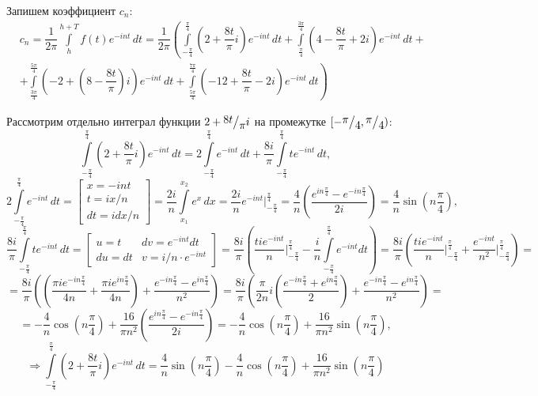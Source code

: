 \documentclass[a4paper, 16pt]{article}
\newcommand{\frc}[2]{\raisebox{2pt}{$#1$}\big/\raisebox{-3pt}{$#2$}}
\begin{document}
\noindent Запишем коэффициент $c_n$:
\begin{align*}
    & c_n=\dfrac{1}{2\pi}\int\limits_{h}^{h+T}f(t)e^{-int}\,dt=\dfrac{1}{2\pi}\left(\int\limits_{-\frac{\pi}{4}}^{\frac{\pi}{4}}\left(2+\dfrac{8t}{\pi}i\right)e^{-int}\,dt+\int\limits_{\frac{\pi}{4}}^{\frac{3\pi}{4}}\left(4-\dfrac{8t}{\pi}+2i\right)e^{-int}\,dt+\right.\\
    &\left. +\int\limits_{\frac{3\pi}{4}}^{\frac{5\pi}{4}}\left(-2+\left(8-\dfrac{8t}{\pi}\right)i\right)e^{-int}\,dt+\int\limits_{\frac{5\pi}{4}}^{\frac{7\pi}{4}}\left(-12+\dfrac{8t}{\pi}-2i\right)e^{-int}\,dt\right)
\end{align*}


\noindent Рассмотрим отдельно интеграл функции $2+\frc{8t}{\pi}i$ на промежутке $[-\frc{\pi}{4}, \frc{\pi}{4})$:
$$
\int\limits_{-\frac{\pi}{4}}^{\frac{\pi}{4}}\left(2+\dfrac{8t}{\pi}i\right)e^{-int}\,dt=
2\int\limits_{-\frac{\pi}{4}}^{\frac{\pi}{4}}e^{-int}\,dt+\dfrac{8i}{\pi}\int\limits_{-\frac{\pi}{4}}^{\frac{\pi}{4}}te^{-int}\,dt,
$$
$$
2\int\limits_{-\frac{\pi}{4}}^{\frac{\pi}{4}}e^{-int}\,dt=\begin{bmatrix}
    x=-int\\
    t=ix/n\\
    dt=idx/n
\end{bmatrix}=
\dfrac{2i}{n}\int\limits_{x_1}^{x_2}e^x\,dx=\dfrac{2i}{n}e^{-int}\bigg|_{-\frac{\pi}{4}}^{\frac{\pi}{4}}=
\dfrac{4}{n}\left(\dfrac{e^{in\frac{\pi}{4}}-e^{-in\frac{\pi}{4}}}{2i}\right)=\dfrac{4}{n}\sin{\left(n\dfrac{\pi}{4}\right)},
$$
$$
\dfrac{8i}{\pi}\int\limits_{-\frac{\pi}{4}}^{\frac{\pi}{4}}te^{-int}\,dt=
\begin{bmatrix}
    u=t & dv=e^{-int}dt\\
    du=dt & v=i/n\cdot e^{-int}
\end{bmatrix}=
\dfrac{8i}{\pi}\left(\dfrac{tie^{-int}}{n}\bigg|_{-\frac{\pi}{4}}^{\frac{\pi}{4}}-\dfrac{i}{n}\int\limits_{-\frac{\pi}{4}}^{\frac{\pi}{4}}e^{-int}dt\right)=
\dfrac{8i}{\pi}\left(\dfrac{tie^{-int}}{n}\bigg|_{-\frac{\pi}{4}}^{\frac{\pi}{4}}+\dfrac{e^{-int}}{n^2}\bigg|_{-\frac{\pi}{4}}^{\frac{\pi}{4}}\right)=
$$
$$
=\dfrac{8i}{\pi}\left(\left(\dfrac{\pi ie^{-i n\frac{\pi}{4}}}{4n}+\dfrac{\pi ie^{in\frac{\pi}{4}}}{4n}\right)+\dfrac{e^{-in\frac{\pi}{4}}-e^{in\frac{\pi}{4}}}{n^2}\right)=
\dfrac{8i}{\pi}\left(\dfrac{\pi}{2n}i\left(\dfrac{e^{-in\frac{\pi}{4}}+e^{in\frac{\pi}{4}}}{2}\right)+\dfrac{e^{-in\frac{\pi}{4}}-e^{in\frac{\pi}{4}}}{n^2}\right)=
$$
$$
=-\dfrac{4}{n}\cos{\left(n\dfrac{\pi}{4}\right)}+\dfrac{16}{\pi n^2}\left(\dfrac{e^{in\frac{\pi}{4}}-e^{-in\frac{\pi}{4}}}{2i}\right)=
-\dfrac{4}{n}\cos{\left(n\dfrac{\pi}{4}\right)}+\dfrac{16}{\pi n^2}\sin{\left(n\dfrac{\pi}{4}\right)},
$$
$$
\Rightarrow\int\limits_{-\frac{\pi}{4}}^{\frac{\pi}{4}}\left(2+\dfrac{8t}{\pi}i\right)e^{-int}\,dt=
\dfrac{4}{n}\sin{\left(n\dfrac{\pi}{4}\right)}-\dfrac{4}{n}\cos{\left(n\dfrac{\pi}{4}\right)}+\dfrac{16}{\pi n^2}\sin{\left(n\dfrac{\pi}{4}\right)}
$$
\end{document}
